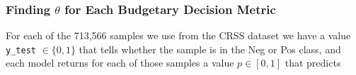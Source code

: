 \subsubsection{Finding $\theta$ for Each Budgetary Decision Metric}

For each of the 713,566 samples we use from the CRSS dataset we have a value \verb|y_test| $\in \{0,1\}$ that tells whether the sample is in the Neg or Pos class, and each model returns for each of those samples a value $p \in [0,1]$ that predicts 





